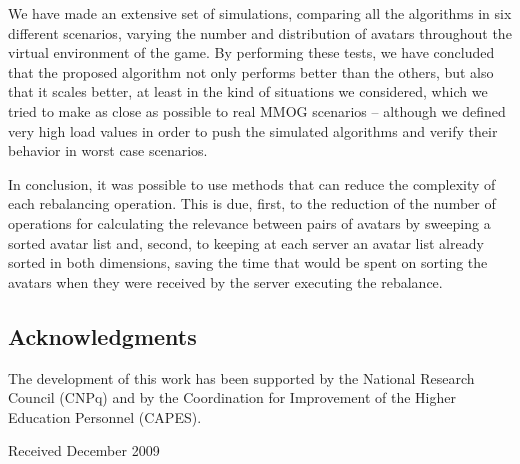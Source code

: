 \documentclass[acmjacm]{acmtrans2m}
\let\mycounter\setcounter
\begin{document}
We have made an extensive set of simulations, comparing all the algorithms in six different scenarios, varying the number and distribution of avatars throughout the virtual environment of the game. By performing these tests, we have concluded that the proposed algorithm not only performs better than the others, but also that it scales better, at least in the kind of situations we considered, which we tried to make as close as possible to real MMOG scenarios -- although we defined very high load values in order to push the simulated algorithms and verify their behavior in worst case scenarios.

In conclusion, it was possible to use methods that can reduce the complexity of each rebalancing operation. This is due, first, to the reduction of the number of operations for calculating the relevance between pairs of avatars by sweeping a sorted avatar list and, second, to keeping at each server an avatar list already sorted in both dimensions, saving the time that would be spent on sorting the avatars when they were received by the server executing the rebalance.



\subsection{Acknowledgments}

The development of this work has been supported by the National Research Council (CNPq) and by the Coordination for Improvement of the Higher Education Personnel (CAPES).



\begin{received}
Received December 2009%
\end{received}


\medskip
\end{document}
